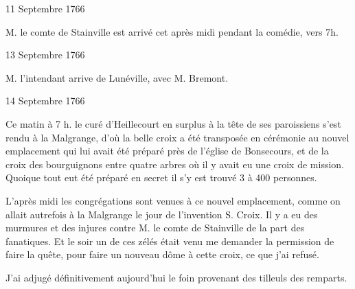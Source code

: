                      \begin{diary}{11 Septembre 1766}{}


                           M. le comte de Stainville est
                           arrivé cet
                           après midi pendant la comédie, vers 7h. \bigskip


                     \end{diary}

                     \begin{diary}{13 Septembre 1766}{}


                           M. l’intendant arrive de
                              Lunéville, avec M.
                              Bremont.
                        \bigskip


                     \end{diary}

                     \begin{diary}{14 Septembre 1766}{}

                         Ce matin à 7 h. le curé d’Heillecourt en
                           surplus à la tête de ses paroissiens s’est
                           rendu à la Malgrange, d’où
                           la belle croix a été
                           transposée en cérémonie
                           au nouvel emplacement
                           qui lui avait été préparé près de l’église
                              de Bonsecours, et de la croix des bourguignons
                           entre quatre arbres où il y avait eu une croix
                           de mission. Quoique tout eut été préparé
                           en secret il s’y est trouvé 3 à 400 personnes. \bigskip


                         L’après midi les congrégations sont venues
                           à ce nouvel emplacement, comme on allait
                           autrefois à la Malgrange le
                           jour de l’invention
                           S. Croix. Il y a eu des murmures et des
                           injures contre M. le comte de Stainville de la part
                           des fanatiques. Et le soir un de ces zélés
                           était venu me demander la permission de
                           faire la quête, pour faire un nouveau
                           dôme à cette croix, ce que j’ai refusé. \bigskip


                         J’ai adjugé définitivement aujourd'hui
                           le foin provenant des tilleuls des remparts. \bigskip


                     \end{diary}

